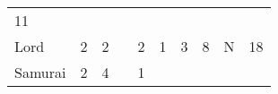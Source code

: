 \documentclass[12pt]{article}
\begin{document}
\begin{longtable}[]{@{}llllllllll@{}}
\begin{minipage}[t]{0.08\columnwidth}
11
\strut\end{minipage}\tabularnewline
\begin{minipage}[t]{0.13\columnwidth}\raggedright\strut
Lord
\strut\end{minipage} &
\begin{minipage}[t]{0.06\columnwidth}\raggedright\strut
2
\strut\end{minipage} &
\begin{minipage}[t]{0.06\columnwidth}\raggedright\strut
2
\strut\end{minipage} &
\begin{minipage}[t]{0.06\columnwidth}\raggedright\strut
\strut\end{minipage} &
\begin{minipage}[t]{0.06\columnwidth}\raggedright\strut
2
\strut\end{minipage} &
\begin{minipage}[t]{0.06\columnwidth}\raggedright\strut
1
\strut\end{minipage} &
\begin{minipage}[t]{0.06\columnwidth}\raggedright\strut
3
\strut\end{minipage} &
\begin{minipage}[t]{0.06\columnwidth}\raggedright\strut
8
\strut\end{minipage} &
\begin{minipage}[t]{0.07\columnwidth}\raggedright\strut
N
\strut\end{minipage} &
\begin{minipage}[t]{0.08\columnwidth}\raggedright\strut
18
\strut\end{minipage}\tabularnewline
\begin{minipage}[t]{0.13\columnwidth}\raggedright\strut
Samurai
\strut\end{minipage} &
\begin{minipage}[t]{0.06\columnwidth}\raggedright\strut
2
\strut\end{minipage} &
\begin{minipage}[t]{0.06\columnwidth}\raggedright\strut
4
\strut\end{minipage} &
\begin{minipage}[t]{0.06\columnwidth}\raggedright\strut
\strut\end{minipage} &
\begin{minipage}[t]{0.06\columnwidth}\raggedright\strut
1
\strut\end{minipage} &
\begin{minipage}[t]{0.06\columnwidth}\raggedright\strut

\end{minipage}
\end{longtable}
\end{document}
